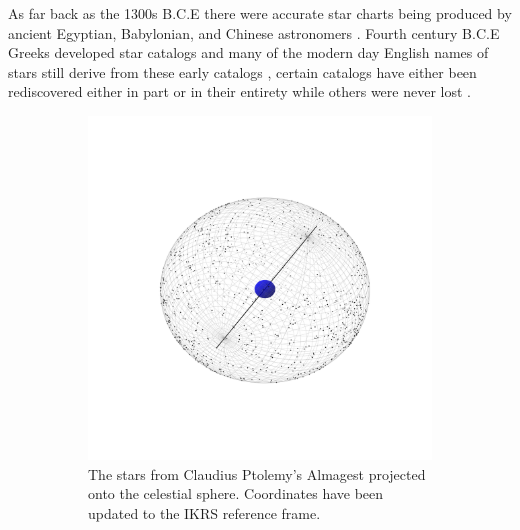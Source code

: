 As far back as the 1300s B.C.E there were accurate star charts being produced
by ancient Egyptian, Babylonian, and Chinese astronomers \citep{Lull2009,
Bonnet2009, Qiu2009, Gullberg2016, Yena2021}. Fourth century B.C.E Greeks
developed star catalogs and many of the modern day English names of stars still
derive from these early catalogs \citep{Hannah2021}, certain catalogs have
either been rediscovered either in part or in their entirety while others were
never 
lost \citep[Figure \ref{fig:starsInHistory}, ][]{Ptolemy150, Manitius1995} .

\begin{figure}[htbp]
  \centering
  \begin{subfigure}[t]{0.3\textwidth}
      \centering
      \includegraphics[width=\textwidth]{figures/introduction/Ptolomey.pdf}
      \caption{The stars from Claudius Ptolemy's Almagest projected onto the celestial
      sphere. Coordinates have been updated to the IKRS reference frame.}
      \label{fig:ptolemy}
  \end{subfigure}
  \begin{subfigure}[t]{0.3\textwidth}
      \centering

\end{subfigure}
\end{figure}
